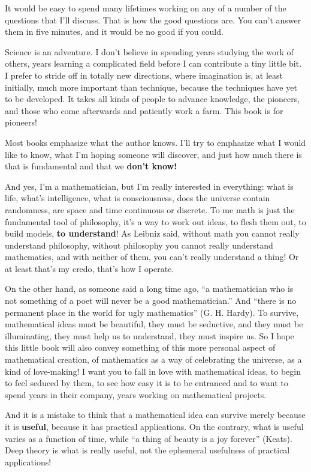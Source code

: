 \documentclass[12pt]{book}
\begin{document}
It would be easy to spend many lifetimes working on any of a number
of the questions that I'll discuss.  That
is how the good questions are.  You can't answer them in five minutes,
and it would be no good if you could.

Science is an adventure.  I don't believe in spending years studying the work
of others, years learning a complicated field before I can contribute a tiny
little bit.  I prefer to stride off in totally new directions, where imagination is,
at least initially, much more important than technique, because the techniques
have yet to be developed.
It takes all kinds of people to advance knowledge, the pioneers, and those
who come afterwards and patiently work a farm.
This book is for pioneers!

Most books emphasize what the author knows. I'll try to emphasize what I would
like to know, what I'm hoping someone will discover, and just how much there is
that is fundamental and that we \textbf{don't know!}

And yes, I'm a mathematician, but I'm really interested in everything: what is
life, what's intelligence, what is consciousness, does the universe contain randomness, are space and
time continuous or discrete.  To me math is just the fundamental tool of
philosophy, it's a way to work out ideas, to flesh them out, to build models, \textbf{to understand}!
As Leibniz said, without math you cannot really understand philosophy, without philosophy
you cannot really understand mathematics, and with neither of them, you can't really
understand a thing!
Or at least that's my credo, that's how I operate.

On the other hand, as someone said a long time ago, ``a mathematician who is not something
of a poet will never be a good mathematician.'' And ``there is no permanent place in the world
for ugly mathematics'' (G. H. Hardy).  To survive, mathematical ideas must be beautiful, they must be
seductive, and they must be illuminating, they must help us to understand, they must inspire us.
So I hope this little book
will also convey something of this more personal aspect of mathematical creation,
of mathematics as a way of celebrating the universe, as a kind of love-making!
I want you to fall in love with mathematical ideas, to begin to feel seduced by them,
to see how easy it is to be entranced and to want to spend years in their company, 
years working on mathematical projects.

And it is a mistake to think that a mathematical idea can survive merely because it is \textbf{useful},
because it has practical applications.  On the contrary, what is useful varies as a function
of time, while ``a thing of beauty is a joy forever'' (Keats).
Deep theory is what is really useful, not the ephemeral usefulness of practical applications!
\end{document}
